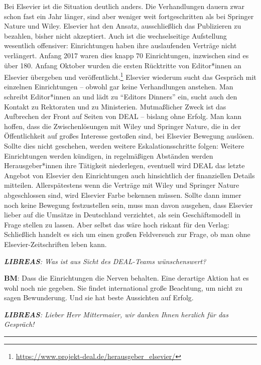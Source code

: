 \documentclass[a4paper,
fontsize=11pt,
oneside,
numbers=noperiodatend,
parskip=half-,
bibliography=totoc,
final
]{scrartcl}
\begin{document}
Bei Elsevier ist die Situation deutlich anders. Die Verhandlungen dauern
zwar schon fast ein Jahr länger, sind aber weniger weit fortgeschritten
als bei Springer Nature und Wiley. Elsevier hat den Ansatz,
ausschließlich das Publizieren zu bezahlen, bisher nicht akzeptiert.
Auch ist die wechselseitige Aufstellung wesentlich offensiver:
Einrichtungen haben ihre auslaufenden Verträge nicht verlängert. Anfang
2017 waren dies knapp 70 Einrichtungen, inzwischen sind es über 180.
Anfang Oktober wurden die ersten Rücktritte von Editor*innen an Elsevier
übergeben und veröffentlicht.\footnote{\url{https://www.projekt-deal.de/herausgeber_elsevier/}}
Elsevier wiederum sucht das Gespräch mit einzelnen Einrichtungen --
obwohl gar keine Verhandlungen anstehen. Man schreibt Editor*innen an
und lädt zu \enquote{Editors Dinners} ein, sucht auch den Kontakt zu
Rektoraten und zu Ministerien. Mutmaßlicher Zweck ist das Aufbrechen der
Front auf Seiten von DEAL -- bislang ohne Erfolg. Man kann hoffen, dass
die Zwischenlösungen mit Wiley und Springer Nature, die in der
Öffentlichkeit auf großes Interesse gestoßen sind, bei Elsevier Bewegung
auslösen. Sollte dies nicht geschehen, werden weitere
Eskalationsschritte folgen: Weitere Einrichtungen werden kündigen, in
regelmäßigen Abständen werden Herausgeber*innen ihre Tätigkeit
niederlegen, eventuell wird DEAL das letzte Angebot von Elsevier den
Einrichtungen auch hinsichtlich der finanziellen Details mitteilen.
Allerspätestens wenn die Verträge mit Wiley und Springer Nature
abgeschlossen sind, wird Elsevier Farbe bekennen müssen. Sollte dann
immer noch keine Bewegung festzustellen sein, muss man davon ausgehen,
dass Elsevier lieber auf die Umsätze in Deutschland verzichtet, als sein
Geschäftsmodell in Frage stellen zu lassen. Aber selbst das wäre hoch
riskant für den Verlag: Schließlich handelt es sich um einen großen
Feldversuch zur Frage, ob man ohne Elsevier-Zeitschriften leben kann.

\emph{\textbf{LIBREAS}: Was ist aus Sicht des DEAL-Teams wünschenswert?}

\textbf{BM}: Dass die Einrichtungen die Nerven behalten. Eine derartige
Aktion hat es wohl noch nie gegeben. Sie findet international große
Beachtung, um nicht zu sagen Bewunderung. Und sie hat beste Aussichten
auf Erfolg.

\emph{\textbf{LIBREAS}: Lieber Herr Mittermaier, wir danken Ihnen
herzlich für das Gespräch!}

\begin{center}\rule{0.5\linewidth}{\linethickness}\end{center}
\end{document}
